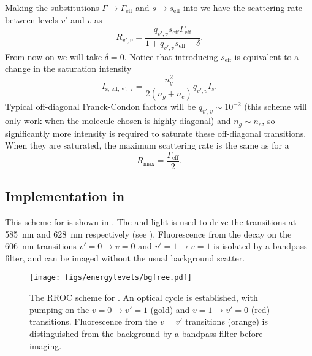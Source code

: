 Making the substitutions $\Gamma\rightarrow\Gamma_\text{eff}$ and $s\rightarrow
s_\text{eff}$ into  we have the scattering rate between
levels $v'$ and $v$ as
%
\begin{equation}
  R_{v',v} = \frac{q_{v',v} s_\text{eff}\Gamma_\text{eff}}{1 + q_{v',v}
  s_\text{eff} + \delta}.
\end{equation}
%
From now on we will take $\delta = 0$. Notice that introducing $s_\text{eff}$
is equivalent to a change in the saturation intensity
%
\begin{equation}
  I_\text{s, eff, v', v} = \frac{n_g^2}{2(n_g + n_e)}q_{v',v}I_s.
\end{equation}
%
%
Typical off-diagonal Franck-Condon factors will be $q_{v',v} \sim 10^{-2}$
(this scheme will only work when the molecule chosen is highly diagonal) and
$n_g \sim n_e$, so significantly more intensity is required to saturate these
off-diagonal transitions. 
When they are saturated, the maximum scattering rate is the same as for a
%
\begin{equation}
  R_\text{max} = \frac{\Gamma_\text{eff}}{2}.
\end{equation}


\subsection{Implementation in \CaF{}}


This scheme for \CaF{} is shown in . The
 and  light is used to drive the transitions at
\SI{585}{\nano\meter} and \SI{628}{\nano\meter} respectively (see
). Fluorescence from the decay on the
\SI{606}{\nano\meter} transitions $v'=0\rightarrow v=0$ and $v'=1\rightarrow
v=1$ is isolated by a bandpass filter, and can be imaged without the usual
background scatter.

\begin{figure}
  \centering
  \texttt{[image: figs/energylevels/bgfree.pdf]}
  \caption{
  The RROC scheme for \CaF{}. An optical cycle is established, with pumping on
  the $v=0 \rightarrow v'=1$ (gold) and $v=1 \rightarrow v'=0$ (red) transitions.
  Fluorescence from the $v=v'$ transitions (orange) is distinguished from the
  background by a bandpass filter before imaging.
  }
  \label{exper:fig:bgfreelevels}
\end{figure}

